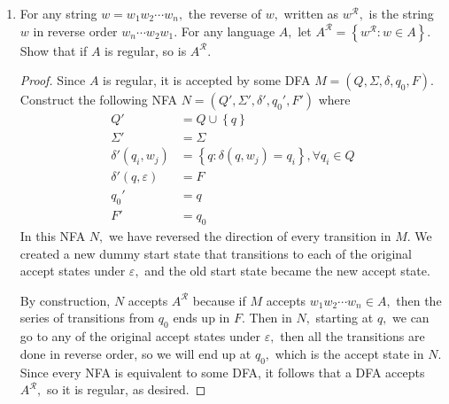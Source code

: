 \documentclass{article}
\begin{document}
\begin{enumerate}
		\newpage
	\item For any string $w=w_1w_2\cdots w_n,$ the reverse of $w,$ written as $w^{\mathcal R},$ is the string $w$ in reverse order $w_n\cdots w_2 w_1.$ For any language $A,$ let $A^{\mathcal R}=\left\{ w^{\mathcal R}:w\in A \right\}.$ Show that if $A$ is regular, so is $A^{\mathcal R}.$
		\begin{proof}
			Since $A$ is regular, it is accepted by some DFA $M=(Q, \Sigma, \delta, q_0, F).$ Construct the following NFA $N=(Q', \Sigma', \delta', q_0', F')$ where
			\begin{align*}
				Q' &= Q \cup \left\{ q \right\}\\
				\Sigma' &= \Sigma \\
				\delta'(q_i, w_j) &= \left\{ q:\delta(q, w_j)=q_i \right\} , \forall q_i\in Q \\
				\delta'(q, \varepsilon) &= F \\
				q_0' &= q \\
				F' &= q_0
			\end{align*}
			In this NFA $N,$ we have reversed the direction of every transition in $M.$ We created a new dummy start state that transitions to each of the original accept states under $\varepsilon,$ and the old start state became the new accept state. 
			
			By construction, $N$ accepts $A^{\mathcal R}$ because if $M$ accepts $w_1w_2\cdots w_n\in A,$ then the series of transitions from $q_0$ ends up in $F.$ Then in $N,$ starting at $q,$ we can go to any of the original accept states under $\varepsilon,$ then all the transitions are done in reverse order, so we will end up at $q_0,$ which is the accept state in $N.$ Since every NFA is equivalent to some DFA, it follows that a DFA accepts $A^{\mathcal R},$ so it is regular, as desired.
		\end{proof}

\end{enumerate}
\end{document}
